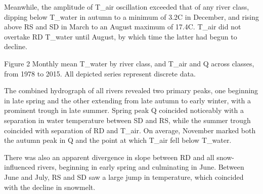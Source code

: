 Meanwhile, the amplitude of T_air oscillation exceeded that of any river class, dipping below T_water in autumn to a minimum of 3.2\degree C in December, and rising above RS and SD in March to an August maximum of 17.4\degree C. T_air did not overtake RD T_water until August, by which time the latter had begun to decline.

\begin{center}
\end{center}

Figure 2 Monthly mean T_water by river class, and T_air and Q across classes, from 1978 to 2015. All depicted series represent discrete data.

The combined hydrograph of all rivers revealed two primary peaks, one beginning in late spring and the other extending from late autumn to early winter, with a prominent trough in late summer. Spring peak Q coincided noticeably with a separation in water temperature between SD and RS, while the summer trough coincided with separation of RD and T_air. On average, November marked both the autumn peak in Q and the point at which T_air fell below T_water.

There was also an apparent divergence in slope between RD and all snow-influenced rivers, beginning in early spring and culminating in June. Between June and July, RS and SD saw a large jump in temperature, which coincided with the decline in snowmelt.

